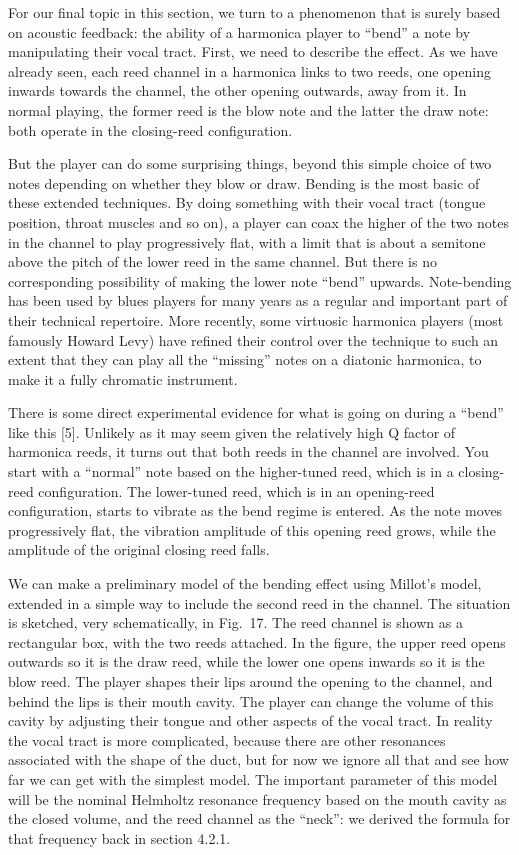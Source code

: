   For our final topic in this section, we turn to a phenomenon that is surely 
  based on acoustic feedback: the ability of a harmonica player to “bend” a 
  note by manipulating their vocal tract. First, we need to describe the 
  effect. As we have already seen, each reed channel in a harmonica links to 
  two reeds, one opening inwards towards the channel, the other opening 
  outwards, away from it. In normal playing, the former reed is the blow note 
  and the latter the draw note: both operate in the closing-reed configuration. 

  But the player can do some surprising things, beyond this simple choice of 
  two notes depending on whether they blow or draw. Bending is the most basic 
  of these extended techniques. By doing something with their vocal tract 
  (tongue position, throat muscles and so on), a player can coax the higher of 
  the two notes in the channel to play progressively flat, with a limit that is 
  about a semitone above the pitch of the lower reed in the same channel. But 
  there is no corresponding possibility of making the lower note “bend” 
  upwards. Note-bending has been used by blues players for many years as a 
  regular and important part of their technical repertoire. More recently, some 
  virtuosic harmonica players (most famously Howard Levy) have refined their 
  control over the technique to such an extent that they can play all the 
  “missing” notes on a diatonic harmonica, to make it a fully chromatic 
  instrument. 

  There is some direct experimental evidence for what is going on during a 
  “bend” like this [5]. Unlikely as it may seem given the relatively high Q 
  factor of harmonica reeds, it turns out that both reeds in the channel are 
  involved. You start with a ``normal'' note based on the higher-tuned reed, 
  which is in a closing-reed configuration. The lower-tuned reed, which is in 
  an opening-reed configuration, starts to vibrate as the bend regime is 
  entered. As the note moves progressively flat, the vibration amplitude of 
  this opening reed grows, while the amplitude of the original closing reed 
  falls. 

  We can make a preliminary model of the bending effect using Millot’s model, 
  extended in a simple way to include the second reed in the channel. The 
  situation is sketched, very schematically, in Fig.\ 17. The reed channel is 
  shown as a rectangular box, with the two reeds attached. In the figure, the 
  upper reed opens outwards so it is the draw reed, while the lower one opens 
  inwards so it is the blow reed. The player shapes their lips around the 
  opening to the channel, and behind the lips is their mouth cavity. The player 
  can change the volume of this cavity by adjusting their tongue and other 
  aspects of the vocal tract. In reality the vocal tract is more complicated, 
  because there are other resonances associated with the shape of the duct, but 
  for now we ignore all that and see how far we can get with the simplest 
  model. The important parameter of this model will be the nominal Helmholtz 
  resonance frequency based on the mouth cavity as the closed volume, and the 
  reed channel as the “neck”: we derived the formula for that frequency back in 
  section 4.2.1. 

